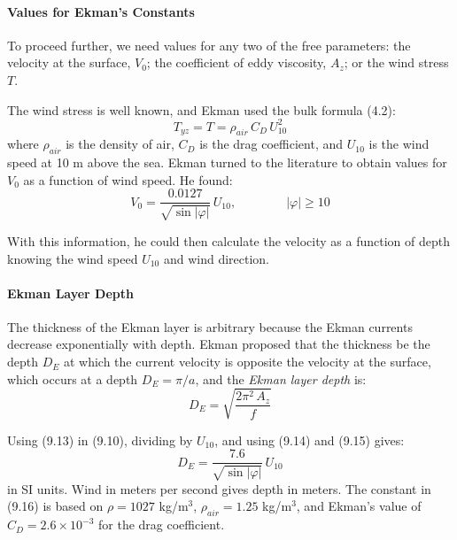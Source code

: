 \paragraph{Values for Ekman's Constants}
To proceed further, we need
values for any two of the free parameters: the velocity at the surface, $V_0$; the
coefficient of eddy viscosity, $A_z$; or the wind stress $T$.

The wind stress is well known, and Ekman used the bulk
formula (4.2):
\begin{equation}
T_{yz} = T = \rho_{air}\, C_D \,U_{10}^2
\end{equation}
where $\rho_{air}$ is the density of air, $C_D$ is the drag
coefficient, and
$U_{10}$ is the wind speed at 10 m above the sea. Ekman turned to the literature
to obtain values for $V_0$ as a function of wind speed. He found:
\begin{equation}
V_0 = \frac{0.0127}{\sqrt{\sin|\varphi|}}\, U_{10}, \qquad \qquad
|\varphi|\ge 10
\end{equation}

With this information, he could then calculate the velocity as a function of
depth knowing the wind speed $U_{10}$ and wind direction.

\paragraph{Ekman Layer Depth}
The thickness of the Ekman layer is arbitrary
because the Ekman currents decrease exponentially with depth. Ekman proposed that
the thickness be the depth $D_E$ at which the current velocity is opposite the
velocity at the surface, which occurs at a depth $D_E = \pi/a$, and the
\textit{Ekman layer depth} is:
\begin{equation}
\boxed{D_E = \sqrt{\frac{2\pi^2\,A_z}{f}}}
\end{equation}

Using (9.13) in (9.10), dividing by $U_{10}$, and using (9.14) and (9.15) gives:
\begin{equation}
D_E = \frac{7.6}{\sqrt{\sin|\varphi|}}\, U_{10}
\end{equation}
in SI units. Wind in meters per second gives depth in meters. The constant
in (9.16) is based on $\rho = 1027 $ kg/m$^3$, $\rho_{air} = 1.25 $
kg/m$^3$, and Ekman's value of $C_D = 2.6 \times 10^{-3}$ for the drag
coefficient.

